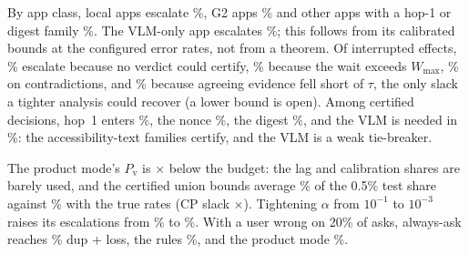 


 By app class, local apps escalate \ClassLocalAsk\%, G2 apps \ClassGtwoAsk\% and other apps with a hop-1 or digest family
\ClassNonGtwoAsk\%. The VLM-only app escalates \ClassVlmAsk\%; this follows from its calibrated bounds at the configured error rates, not from a theorem. Of interrupted effects, \WhyStruct\% escalate because no verdict could certify, \WhyWait\% because the wait exceeds $W_{\max}$, \WhyContra\% on contradictions, and
\WhyUncert\% because agreeing evidence fell short of $\tau$, the only slack a tighter analysis could recover (a lower bound is open). Among certified decisions, hop~1 enters \ShareHop\%, the nonce \ShareNonce\%, the digest \ShareDigest\%, and the VLM is needed in
\ShareVlm\%: the accessibility-text families certify, and the VLM is a weak tie-breaker.

 The product mode's $P_{\mathrm{v}}$ is \SimBudgetRatio$\times$ below the budget: the lag and calibration shares are barely used, and the certified
union bounds average \DecompBcp\% of the 0.5\% test share against \DecompBtrue\% with the true rates (CP slack \DecompCPratio$\times$). Tightening $\alpha$ from $10^{-1}$ to $10^{-3}$
raises its escalations from \SweepAskLo\% to \SweepAskHi\%. With a user wrong on 20\% of asks, always-ask reaches \UserAskAllTwenty\% dup + loss, the rules \UserRulesTwenty\%, and
the product mode \UserGhostTwenty\%.


